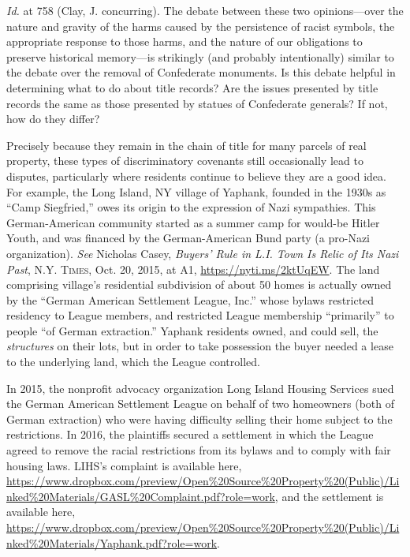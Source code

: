 \textit{Id.} at 758 (Clay, J. concurring). The debate between these two
opinions---over the nature and gravity of the harms caused by the persistence of
racist symbols, the appropriate response to those harms, and the nature of our
obligations to preserve historical memory---is strikingly (and probably
intentionally) similar to the debate over the removal of Confederate monuments.
Is this debate helpful in determining what to do about title records? Are the
issues presented by title records the same as those presented by statues of
Confederate generals? If not, how do they differ?


\item Precisely because they remain in the chain of title for many parcels of
real property, these types of discriminatory covenants still occasionally lead
to disputes, particularly where residents continue to believe they are a good
idea. For example, the Long Island, NY village of Yaphank, founded in the 1930s
as ``Camp Siegfried,'' owes its origin to the expression of Nazi sympathies.
This German-American community started as a summer camp for would-be Hitler
Youth, and was financed by the German-American Bund party (a pro-Nazi
organization). \textit{See} Nicholas Casey, \textit{Buyers' Rule in L.I. Town Is
Relic of Its Nazi Past}, \textsc{N.Y. Times}, Oct. 20, 2015, at A1,
\url{https://nyti.ms/2ktUqEW}. The land comprising village's residential
subdivision of about 50 homes is actually owned by the ``German American
Settlement League, Inc.'' whose bylaws restricted residency to League members,
and restricted League membership ``primarily'' to people ``of German
extraction.'' Yaphank residents owned, and could sell, the \textit{structures}
on their lots, but in order to take possession the buyer needed a lease to the
underlying land, which the League controlled.

In 2015, the nonprofit advocacy organization Long Island Housing Services sued
the German American Settlement League on behalf of two homeowners (both of
German extraction) who were having difficulty selling their home subject to the
restrictions. In 2016, the plaintiffs secured a settlement in which the League
agreed to remove the racial restrictions from its bylaws and to comply with fair
housing laws. LIHS's complaint is available here,
\url{https://www.dropbox.com/preview/Open\%20Source\%20Property\%20(Public)/Linked\%20Materials/GASL\%20Complaint.pdf?role=work},
and the settlement is available here,
\url{https://www.dropbox.com/preview/Open\%20Source\%20Property\%20(Public)/Linked\%20Materials/Yaphank.pdf?role=work}.

